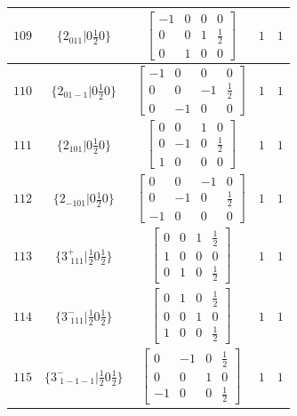 \documentclass[fleqn,8pt]{jsarticle}
\begin{document}
\begin{longtable}{ccccc}
$ 109 $ & $ \{2{}_{011}|0 \frac{1}{2} 0\} $ & $ \begin{bmatrix} -1 & 0 & 0 & 0 \\ 0 & 0 & 1 & \frac{1}{2} \\ 0 & 1 & 0 & 0 \end{bmatrix} $ & $ 1 $ & $ 1 $ \\ \hline
$ 110 $ & $ \{2{}_{01-1}|0 \frac{1}{2} 0\} $ & $ \begin{bmatrix} -1 & 0 & 0 & 0 \\ 0 & 0 & -1 & \frac{1}{2} \\ 0 & -1 & 0 & 0 \end{bmatrix} $ & $ 1 $ & $ 1 $ \\ \hline
$ 111 $ & $ \{2{}_{101}|0 \frac{1}{2} 0\} $ & $ \begin{bmatrix} 0 & 0 & 1 & 0 \\ 0 & -1 & 0 & \frac{1}{2} \\ 1 & 0 & 0 & 0 \end{bmatrix} $ & $ 1 $ & $ 1 $ \\ \hline
$ 112 $ & $ \{2{}_{-101}|0 \frac{1}{2} 0\} $ & $ \begin{bmatrix} 0 & 0 & -1 & 0 \\ 0 & -1 & 0 & \frac{1}{2} \\ -1 & 0 & 0 & 0 \end{bmatrix} $ & $ 1 $ & $ 1 $ \\ \hline
$ 113 $ & $ \{3^{+}_{\,\,111}|\frac{1}{2} 0 \frac{1}{2}\} $ & $ \begin{bmatrix} 0 & 0 & 1 & \frac{1}{2} \\ 1 & 0 & 0 & 0 \\ 0 & 1 & 0 & \frac{1}{2} \end{bmatrix} $ & $ 1 $ & $ 1 $ \\ \hline
$ 114 $ & $ \{3^{-}_{\,\,111}|\frac{1}{2} 0 \frac{1}{2}\} $ & $ \begin{bmatrix} 0 & 1 & 0 & \frac{1}{2} \\ 0 & 0 & 1 & 0 \\ 1 & 0 & 0 & \frac{1}{2} \end{bmatrix} $ & $ 1 $ & $ 1 $ \\ \hline
$ 115 $ & $ \{3^{-}_{\,\,1-1-1}|\frac{1}{2} 0 \frac{1}{2}\} $ & $ \begin{bmatrix} 0 & -1 & 0 & \frac{1}{2} \\ 0 & 0 & 1 & 0 \\ -1 & 0 & 0 & \frac{1}{2} \end{bmatrix} $ & $ 1 $ & $ 1 $ \\ \hline

\end{longtable}
\end{document}
